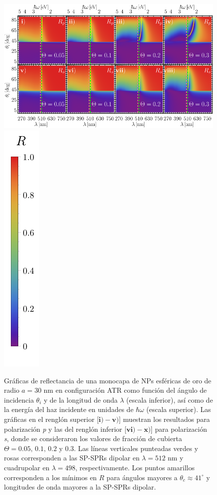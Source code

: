 	\begin{figure}[h!]\centering
\includegraphics[width = .75\linewidth]{2-Resultados/figs/6-AuThetaVar/0-2D_Grid}%
\includegraphics[scale=.85, trim={00 -5 00 00}, clip]{2-Resultados/figs/0-RBar_v}
	\caption{Gráficas de reflectancia de una monocapa de NPs esféricas de oro de radio $a=30$ nm en configuración ATR como función del ángulo de incidencia $\theta_i$ y de la longitud de onda $\lambda$ (escala inferior), así como de la energía del haz incidente en unidades de $\hbar\omega$ (escala superior).  Las gráficas   en el renglón superior [$\mathbf{i)-v)}$] muestran los resultados para  polarización \emph{p} y las del renglón inferior  [$\mathbf{vi)-x)}$]  para polarización  \emph{s}, donde se consideraron los valores de fracción de cubierta $\Theta = 0.05,\,0.1,\,0.2$ y $0.3$.  Las líneas verticales punteadas verdes y rosas corresponden a las SP-SPRs dipolar en $\lambda=512$ nm y  cuadrupolar en $\lambda=498$, respectivamente.  Los puntos amarillos corresponden a los mínimos en $R$ para ángulos mayores a $\theta_c\approx 41^\circ$ y longitudes de onda mayores a la SP-SPRs dipolar.
}	\label{fig:Au-R-Theta}	
	\end{figure}	

